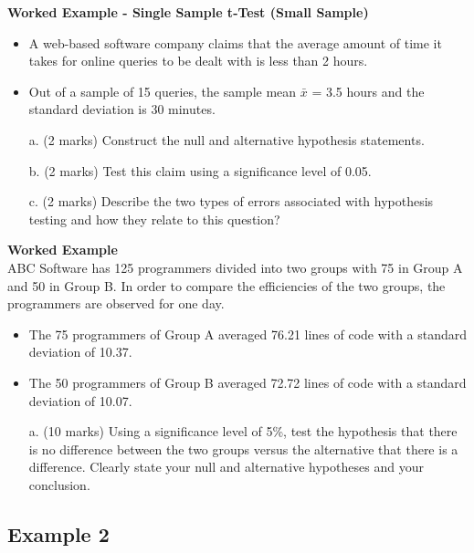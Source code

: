 	\item \textbf{Worked Example  - Single Sample t-Test (Small Sample)  } \\ %
	\begin{itemize}
		\item 	A web-based software company claims that the average amount of time it takes for
		online queries to be dealt with is less than 2 hours. 
		\item Out of a sample of 15 queries, the
		sample mean $\bar{x}$ = 3.5 hours and the standard deviation is 30 minutes.
	\end{itemize}
	
	\begin{itemize}
		\item[a.](2 marks) Construct the null and alternative hypothesis statements.
		\item[b.](2 marks) Test this claim using a significance level of 0.05.
		\item[c.](2 marks) Describe the two types of errors associated with hypothesis testing and how
		they relate to this question?
	\end{itemize}
	
	\item \textbf{Worked Example} \\ ABC Software has 125 programmers divided into two groups with 75 in
	Group A and 50 in Group B. In order to compare the efficiencies of the
	two groups, the programmers are observed for one day. \begin{itemize} \item The 75
		programmers of Group A averaged 76.21 lines of code with a standard
		deviation of 10.37. \item The 50 programmers of Group B averaged 72.72
		lines of code with a standard deviation of 10.07. \end{itemize}
	\begin{itemize}
		\item[a.](10 marks) Using a significance
		level of 5\%, test the hypothesis that there is no difference between the
		two groups versus the alternative that there is a difference. Clearly state
		your null and alternative hypotheses and your conclusion.
	\end{itemize}
	


\subsection{Example 2}

